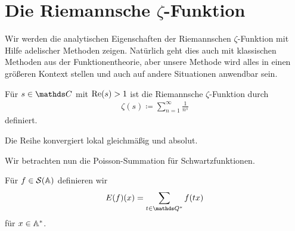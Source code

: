 \chapter{Die Riemannsche $\zeta$-Funktion}

Wir werden die analytischen Eigenschaften der Riemannschen $\zeta$-Funktion mit Hilfe adelischer Methoden zeigen.
Natürlich geht dies auch mit klassischen Methoden aus der Funktionentheorie,
aber unsere Methode wird alles in einen größeren Kontext stellen
und auch auf andere Situationen anwendbar sein.

\begin{defi}
Für $s\in \C$ mit $\operatorname{Re}(s)>1$ ist die Riemannsche $\zeta$-Funktion durch
\begin{align*}
	\zeta(s)\coloneqq \sum_{n=1}^\infty \frac{1}{n^s}
\end{align*}
definiert.
\end{defi}

\begin{lem}
Die Reihe konvergiert lokal gleichmäßig und absolut.
\end{lem}

Wir betrachten nun die Poisson-Summation für Schwartzfunktionen.

\begin{defi}
Für $f \in \mathcal{S}(\mathbb{A})$ definieren wir
\begin{align*}
	E(f)(x)=\sum_{t \in \Q^\ast} f(tx)
\end{align*}
für $x \in \mathbb{A}^\ast$.
\end{defi}

